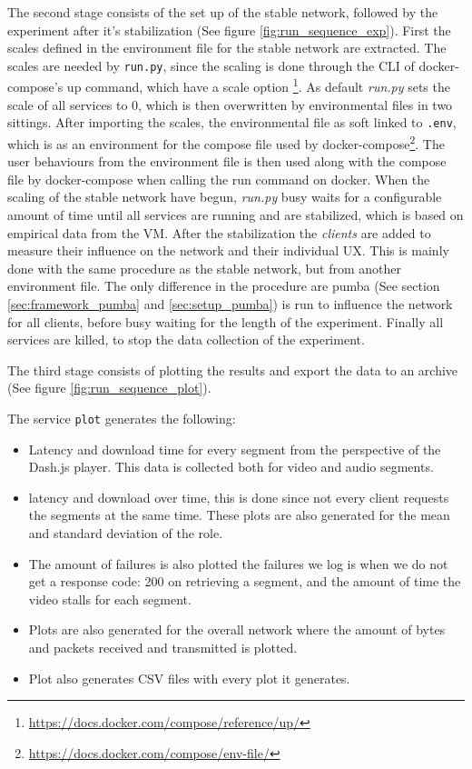 

The second stage consists of the set up of the stable network, followed by the experiment after it's stabilization (See figure \ref{fig:run_sequence_exp}). First the scales defined in the environment file for the stable network are extracted. The scales are needed by \texttt{run.py}, since the scaling is done through the \ac{CLI} of docker-compose's up command, which have a scale option \footnote{\url{https://docs.docker.com/compose/reference/up/}}. As default \textit{run.py} sets the scale of all services to 0, which is then overwritten by environmental files in two sittings.
After importing the scales, the environmental file as soft linked to \texttt{.env}, which is as an environment for the compose file used by docker-compose\footnote{\url{https://docs.docker.com/compose/env-file/}}.
The user behaviours from the environment file is then used along with the compose file by docker-compose when calling the run command on docker.
When the scaling of the stable network have begun, \textit{run.py} busy waits for a configurable amount of time until all services are running and are stabilized, which is based on empirical data from the \acs{VM}.
After the stabilization the \textit{clients} are added to measure their influence on the network and their individual \acs{UX}. This is mainly done with the same procedure as the stable network, but from another environment file. The only difference in the procedure are pumba (See section \ref{sec:framework_pumba}
 and \ref{sec:setup_pumba}) is run to influence the network for all clients, before busy waiting for the length of the experiment.
Finally all services are killed, to stop the data collection of the experiment.



The third stage consists of plotting the results and export the data to an archive (See figure \ref{fig:run_sequence_plot}).

The service \texttt{plot} generates the following:
\begin{itemize}
    \item Latency and download time for every segment from the perspective of the Dash.js player. This data is collected both for video and audio segments.
    \item latency and download over time, this is done since not every client requests the segments at the same time. These plots are also generated for the mean and standard deviation of the role.
    \item The amount of failures is also plotted the failures we log is when we do not get a response code: 200 on retrieving a segment, and the amount of time the video stalls for each segment.
    \item Plots are also generated for the overall network where the amount of bytes and packets received and transmitted is plotted.
    \item Plot also generates \acs{CSV} files with every plot it generates.
\end{itemize}

